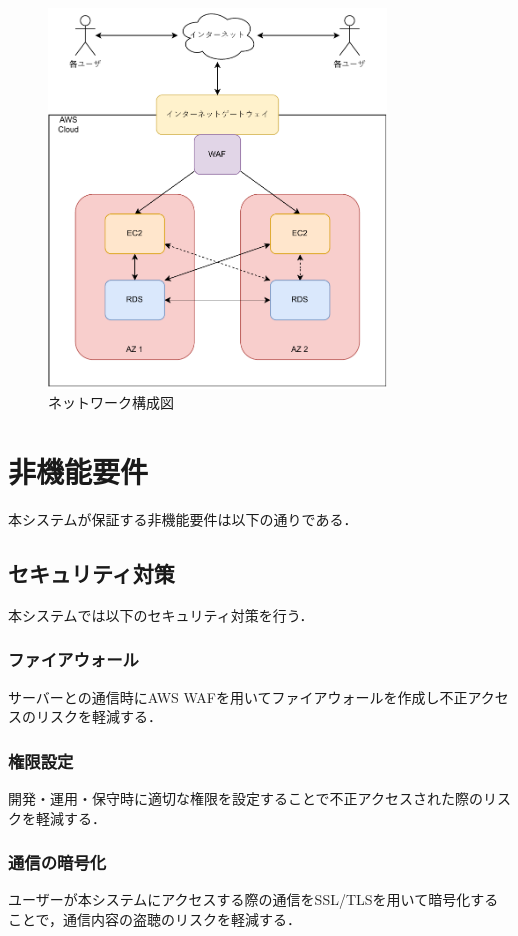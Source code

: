 \documentclass[a4paper, titlepage]{jsarticle}
\begin{document}
\begin{figure}[H]
  \includegraphics[width=0.8\textwidth]{./other/network_img.pdf}
  \caption{ネットワーク構成図}
  \label{fig:network}
\end{figure}

\section{非機能要件}
本システムが保証する非機能要件は以下の通りである．
\subsection{セキュリティ対策}
本システムでは以下のセキュリティ対策を行う．
\subsubsection{ファイアウォール}
サーバーとの通信時にAWS WAFを用いてファイアウォールを作成し不正アクセスのリスクを軽減する．
\subsubsection{権限設定}
開発・運用・保守時に適切な権限を設定することで不正アクセスされた際のリスクを軽減する．
\subsubsection{通信の暗号化}
ユーザーが本システムにアクセスする際の通信をSSL/TLSを用いて暗号化することで，通信内容の盗聴のリスクを軽減する．
\end{document}
